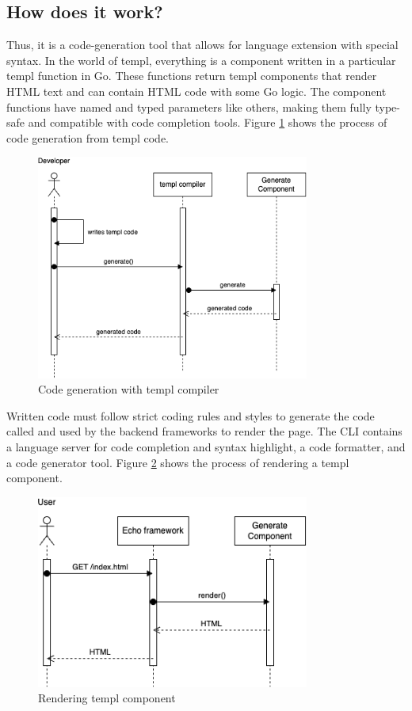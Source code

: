 \subsection{How does it work?}
Thus, it is a code-generation tool that allows for language extension with special syntax. In the world of templ, everything is a component written in a particular templ function in Go. These functions return templ components that render HTML text and can contain HTML code with some Go logic. The component functions have named and typed parameters like others, making them fully type-safe and compatible with code completion tools. Figure \ref{fig:templ-generation} shows the process of code generation from templ code.

\begin{figure}[!h]
    \centering
    \includegraphics[width=0.8\textwidth, keepaspectratio]{figures/templ_sequence_generation.drawio.png}
    \caption{Code generation with templ compiler}
    \label{fig:templ-generation}
\end{figure}

Written code must follow strict coding rules and styles to generate the code called and used by the backend frameworks to render the page. The CLI contains a language server for code completion and syntax highlight, a code formatter, and a code generator tool. Figure \ref{fig:templ-rendering} shows the process of rendering a templ component.

\begin{figure}[!h]
    \centering
    \includegraphics[width=0.8\textwidth, keepaspectratio]{figures/templ_sequence_render.drawio.png}
    \caption{Rendering templ component}
    \label{fig:templ-rendering}
\end{figure}

